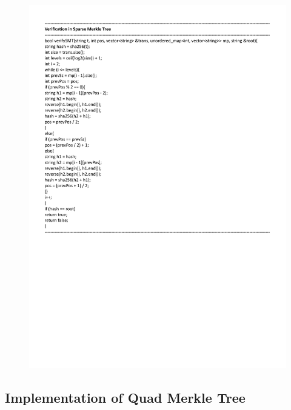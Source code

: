  


\begin{figure}[H]
    \centering
    \includegraphics[scale=0.65]{figures/smt_verify.pdf}
 
\end{figure}

\subsection{Implementation of Quad Merkle Tree}

 

